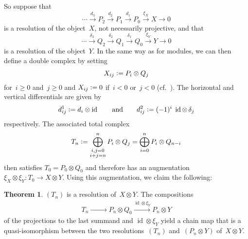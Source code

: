 \documentclass[12pt]{article}
\theoremstyle{definition}
\newtheorem{Theorem}[Satz]{Theorem}
\theoremstyle{break}
\DeclareMathOperator\id{id}
\renewcommand{\1}{\mathbbm{1}}
\newcommand{\ot}{\mathbin{\otimes}}
\newcommand{\deq}{\vcentcolon =}
\begin{document}
So suppose that
\[\cdots \overset{d_3}{\longrightarrow} P_2
\overset{d_2}{\longrightarrow} P_1
\overset{d_1}{\longrightarrow} P_0 \overset{\xi_X}{\longrightarrow} X \to 0\]
is a resolution of the object~$X$, not necessarily projective, and that
\[\cdots \overset{\delta_3}{\longrightarrow} Q_2
\overset{\delta_2}{\longrightarrow} Q_1
\overset{\delta_1}{\longrightarrow} Q_0 \overset{\xi_Y}{\longrightarrow} Y \to 0\]
is a resolution of the object~$Y$. In the same way as for modules, we can then define a double complex by setting
\[X_{ij} \deq P_i \ot Q_j\]
for~$i \ge 0$ and~$j \ge 0$ and $X_{ij} \deq 0$ if~$i < 0$ or~$j < 0$ (cf.~\cite[Chap.~V, Sec.~1, p.~168]{HiS}). The horizontal and vertical differentials are given by
\[d^1_{ij} \deq d_i \ot \id  \qquad \text{and} \qquad
d^2_{ij} \deq (-1)^i \; \id \ot \, \delta_j \]
respectively. The associated total complex
\[T_n \deq \bigoplus_{\substack{i,j=0 \\i+j=n}}^n P_{i} \ot Q_{j} =
\bigoplus_{i=0}^n P_{i} \ot Q_{n-i} \]
then satisfies $T_0 = P_0 \ot Q_0$ and therefore has an augmentation
$\xi_X \ot \xi_Y \colon T_0 \to X \ot Y$. Using this augmentation, we claim the following:
\begin{Theorem} \label{TensProdRes}
$(T_n)$ is a resolution of~$X \ot Y$. The compositions
\begin{align*}
T_n \xrightarrow{\phantom{\id \ot \xi_Y}}
P_n \ot Q_0 \xrightarrow{\id \ot \xi_Y} P_n \ot Y
\end{align*}
of the projections to the last summand and $\id \ot \xi_Y$ yield a chain map that is a quasi-isomorphism between the two resolutions~$(T_n)$
and~$(P_n \ot Y)$ of~$X \ot Y$.
\end{Theorem}
\end{document}
